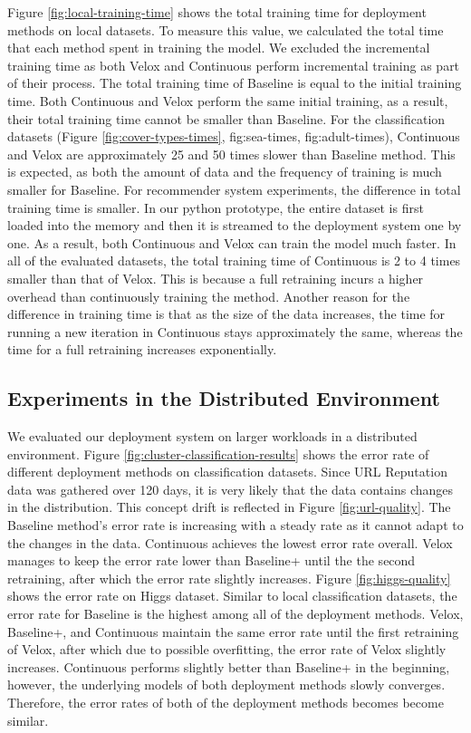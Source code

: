 \documentclass{vldb}
\begin{document}
Figure \ref{fig:local-training-time} shows the total training time for deployment methods on local datasets.
To measure this value, we calculated the total time that each method spent in training the model.
We excluded the incremental training time as both Velox and Continuous perform incremental training as part of their process.
The total training time of Baseline is equal to the initial training time.
Both Continuous and Velox perform the same initial training, as a result, their total training time cannot be smaller than Baseline.
For the classification datasets (Figure \ref{fig:cover-types-times}, {fig:sea-times}, {fig:adult-times}), Continuous and Velox are approximately 25 and 50 times slower than Baseline method.
This is expected, as both the amount of data and the frequency of training is much smaller for Baseline.
For recommender system experiments, the difference in total training time is smaller.
In our python prototype, the entire dataset is first loaded into the memory and then it is streamed to the deployment system one by one.
As a result, both Continuous and Velox can train the model much faster.
In all of the evaluated datasets, the total training time of Continuous is 2 to 4 times smaller than that of Velox.
This is because a full retraining incurs a higher overhead than continuously training the method.
Another reason for the difference in training time is that as the size of the data increases, the time for running a new iteration in Continuous stays approximately the same, whereas the time for a full retraining increases exponentially.

\subsection{Experiments in the Distributed Environment}
We evaluated our deployment system on larger workloads in a distributed environment.
Figure \ref{fig:cluster-classification-results} shows the error rate of different deployment methods on classification datasets.
Since URL Reputation data was gathered over 120 days, it is very likely that the data contains changes in the distribution.
This concept drift is reflected in Figure \ref{fig:url-quality}.
The Baseline method's error rate is increasing with a steady rate as it cannot adapt to the changes in the data.
Continuous achieves the lowest error rate overall.
Velox manages to keep the error rate lower than Baseline+ until the the second retraining, after which the error rate slightly increases. 
Figure \ref{fig:higgs-quality} shows the error rate on Higgs dataset.
Similar to local classification datasets, the error rate for Baseline is the highest among all of the deployment methods.
Velox, Baseline+, and Continuous maintain the same error rate until the first retraining of Velox, after which due to possible overfitting, the error rate of Velox slightly increases.
Continuous performs slightly better than Baseline+ in the beginning, however, the underlying models of both deployment methods slowly converges.
Therefore, the error rates of both of the deployment methods becomes become similar.
\end{document}
